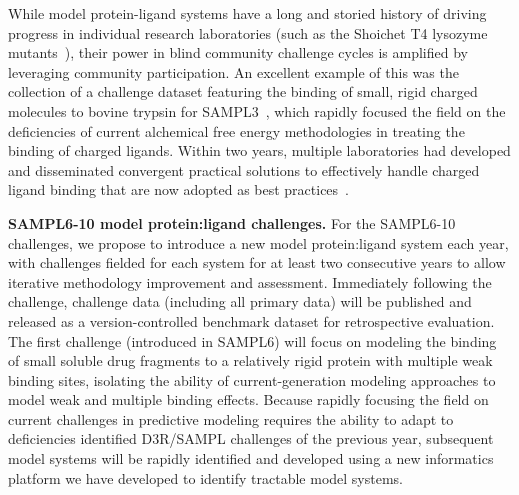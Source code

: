 \documentclass[11pt]{article}
\begin{document}
While model protein-ligand systems have a long and storied history of driving progress in individual research laboratories (such as the Shoichet T4 lysozyme mutants~\cite{shoichet}), their power in blind community challenge cycles is amplified by leveraging community participation.
An excellent example of this was the collection of a challenge dataset featuring the binding of small, rigid charged molecules to bovine trypsin for SAMPL3~\cite{Newman:2011:JComputAidedMolDes}, which rapidly focused the field on the deficiencies of current alchemical free energy methodologies in treating the binding of charged ligands.
Within two years, multiple laboratories had developed and disseminated convergent practical solutions to effectively handle charged ligand binding that are now adopted as best practices~\cite{Rocklin:2013:TheJournalofChemicalPhysicsb,Reif:2014:JournalofComputationalChemistrya}.

{\bf SAMPL6-10 model protein:ligand challenges.} For the SAMPL6-10 challenges, we propose to introduce a new model protein:ligand system each year, with challenges fielded for each system for at least two consecutive years to allow iterative methodology improvement and assessment.
Immediately following the challenge, challenge data (including all primary data) will be published and released as a version-controlled benchmark dataset for retrospective evaluation.
The first challenge (introduced in SAMPL6) will focus on modeling the binding of small soluble drug fragments to a relatively rigid protein with multiple weak binding sites, isolating the ability of current-generation modeling approaches to model weak and multiple binding effects.
Because rapidly focusing the field on current challenges in predictive modeling requires the ability to adapt to deficiencies identified D3R/SAMPL challenges of the previous year, subsequent model systems will be rapidly identified and developed using a new informatics platform we have developed to identify tractable model systems.
\end{document}
